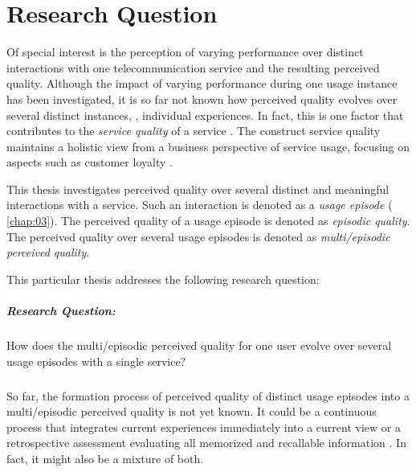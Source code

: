 \section{Research Question}
Of special interest is the perception of varying performance over distinct interactions with one telecommunication service and the resulting perceived quality.
Although the impact of varying performance during one usage instance has been investigated, it is so far not known how perceived quality evolves over several distinct instances, \ie, individual experiences.
In fact, this is one factor that contributes to the \emph{service quality} of a service \citep[][]{berry_quality_1985, zeithaml_behavioral_1996}.
The construct service quality maintains a holistic view from a business perspective of service usage, focusing on aspects such as customer loyalty \citep{parasuraman_conceptual_1985}.

This thesis investigates perceived quality over several distinct and meaningful interactions with a service.
Such an interaction is denoted as a \emph{usage episode} (\cf{} \autoref{chap:03}).
The perceived quality of a usage episode is denoted as \emph{episodic quality}.
The perceived quality over several usage episodes is denoted as \emph{multi\-/episodic perceived quality}.

This particular thesis addresses the following research question: 
\subparagraph*{Research Question:}
How does the multi\-/episodic perceived quality for one user evolve over several usage episodes with a single service?

\subparagraph*{}
So far, the formation process of perceived quality of distinct usage episodes into a multi\-/episodic perceived quality is not yet known.
It could be a continuous process that integrates current experiences immediately into a current view or a retrospective assessment evaluating all memorized and recallable information \citep[][]{hogarth_order_1992}. 
In fact, it might also be a mixture of both.


